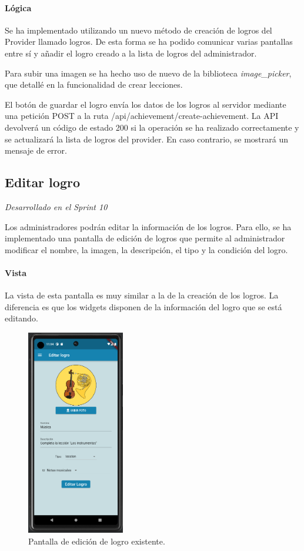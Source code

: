 \paragraph*{Lógica}
Se ha implementado utilizando un nuevo método de creación de logros del Provider llamado logros. De esta forma
se ha podido comunicar varias pantallas entre sí y añadir el logro creado a la lista de logros del administrador.


Para subir una imagen se ha hecho uso de nuevo de la biblioteca \textit{image\_picker}, que detallé en la funcionalidad de crear lecciones.

El botón de guardar el logro envía los datos de los logros al servidor mediante una petición POST a la ruta /api/achievement/create-achievement. 
La API devolverá un código de estado 200 si la operación se ha realizado correctamente y se actualizará la lista de logros del provider. 
En caso contrario, se mostrará un mensaje de error.


\subsection{Editar logro} 

\textit{Desarrollado en el Sprint 10}

Los administradores podrán editar la información de los logros. Para ello, se ha implementado una pantalla de edición de logros 
que permite al administrador modificar el nombre, la imagen, la descripción, el tipo y la condición del logro.

\paragraph*{Vista}
La vista de esta pantalla es muy similar a la de la creación de los logros. La diferencia es que los widgets disponen de la información del logro que se está editando.

\begin{figure}[H]
  \centering
  \includegraphics[width=0.38\textwidth]{imagenes/c7/editarlogro.png}
  \caption{Pantalla de edición de logro existente.} 
  \label{fig:edicion_logro}
\end{figure}


